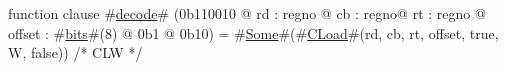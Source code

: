 function clause #\hyperref[zdecode]{decode}# (0b110010 @ rd : regno @ cb : regno@ rt : regno @ offset : #\hyperref[zbits]{bits}#(8) @ 0b1 @ 0b10) = #\hyperref[zSome]{Some}#(#\hyperref[zCLoad]{CLoad}#(rd, cb, rt, offset, true,  W, false)) /* CLW */
